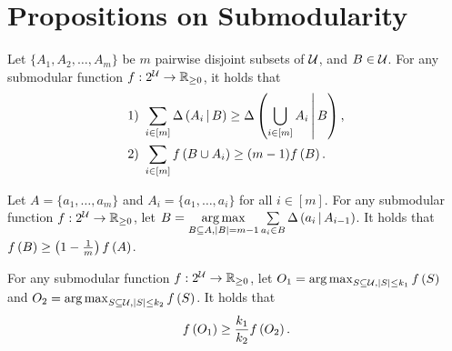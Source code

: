 \section{Propositions on Submodularity} \label{apx:prop}

\begin{proposition}\label{prop:sum-marge}
Let $\{A_1, A_2, \ldots, A_m\}$ be $m$ pairwise disjoint subsets of $\mathcal U$,
and $B\in \mathcal U$.
For any submodular function $f: 2^\mathcal U \to \mathbb{R}_{\ge 0}$,
it holds that
\begin{align*}
\text{1) }&\sum\limits_{i\in [m]} \Delta \left( A_i \, \middle| \, B \right)\ge \Delta \left( \bigcup\limits_{i\in [m]}A_i \, \middle| \, B \right),\\
\text{2) }&\sum_{i\in [m]}f \left( B\cup A_i \right)\ge (m-1)f \left( B \right).
\end{align*}
\end{proposition}

\begin{proposition}\label{prop:subset}
Let $A=\{a_1, \ldots, a_m\}$ and $A_i = \{a_1, \ldots, a_i\}$ for all $i\in [m]$.
For any submodular function $f: 2^\mathcal U \to \mathbb{R}_{\ge 0}$,
let $B = \operatorname*{arg\,max}\limits_{B\subseteq A, |B| = m-1}\sum\limits_{a_i \in B}\Delta \left( a_i \, \middle| \, A_{i-1} \right)$.
It holds that
$f \left( B \right) \ge \left(1-\frac{1}{m}\right)f \left( A \right)$.
\end{proposition}

\begin{proposition}\label{prop:dif-opt}
For any submodular function $f: 2^\mathcal U \to \mathbb{R}_{\ge 0}$,
let $O_1 = \operatorname*{arg\,max}_{S\subseteq \mathcal U, |S|\le k_1} f \left( S \right)$ and 
$O_2 = \operatorname*{arg\,max}_{S\subseteq \mathcal U, |S|\le k_2} f \left( S \right)$.
It holds that 
\[f \left( O_1 \right) \ge \frac{k_1}{k_2}f \left( O_2 \right).\]
\end{proposition}